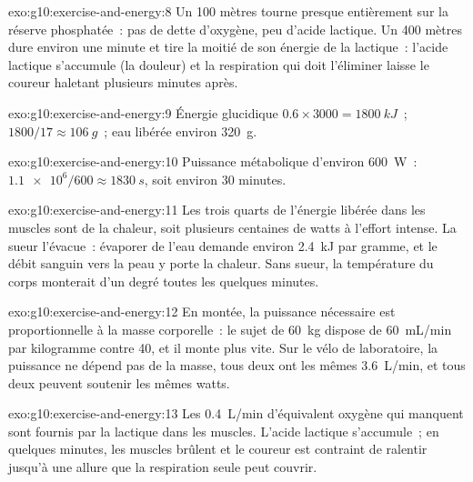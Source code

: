 \begin{solution}{exo:g10:exercise-and-energy:8}
Un 100 mètres tourne presque entièrement sur la réserve phosphatée~:
pas de dette d'oxygène, peu d'acide lactique. Un 400 mètres dure environ
une minute et tire la moitié de son énergie de la 
lactique~: l'acide lactique s'accumule (la douleur) et la respiration
qui doit l'éliminer laisse le coureur haletant plusieurs minutes après.
\end{solution}

\begin{solution}{exo:g10:exercise-and-energy:9}
Énergie glucidique $0.6 \times 3000 = \qty{1800}{kJ}$~; 
$1800/17 \approx \qty{106}{g}$~; eau libérée environ \qty{320}{g}.
\end{solution}

\begin{solution}{exo:g10:exercise-and-energy:10}
Puissance métabolique d'environ \qty{600}{W}~: $\num{1.1e6}/600 \approx
\qty{1830}{s}$, soit environ 30 minutes.
\end{solution}

\begin{solution}{exo:g10:exercise-and-energy:11}
Les trois quarts de l'énergie libérée dans les muscles sont de la
chaleur, soit plusieurs centaines de watts à l'effort intense. La sueur
l'évacue~: évaporer de l'eau demande environ \qty{2.4}{kJ} par gramme,
et le débit sanguin vers la peau y porte la chaleur. Sans sueur, la
température du corps monterait d'un degré toutes les quelques minutes.
\end{solution}

\begin{solution}{exo:g10:exercise-and-energy:12}
En montée, la puissance nécessaire est proportionnelle à la masse
corporelle~: le sujet de \qty{60}{kg} dispose de \qty{60}{mL/min} par
kilogramme contre \num{40}, et il monte plus vite. Sur le vélo de
laboratoire, la puissance ne dépend pas de la masse, tous deux ont les
mêmes \qty{3.6}{L/min}, et tous deux peuvent soutenir les mêmes watts.
\end{solution}

\begin{solution}{exo:g10:exercise-and-energy:13}
Les \qty{0.4}{L/min} d'équivalent oxygène qui manquent sont fournis par
la  lactique dans les muscles. L'acide lactique s'accumule~;
en quelques minutes, les muscles brûlent et le coureur est contraint de
ralentir jusqu'à une allure que la respiration seule peut couvrir.
\end{solution}

